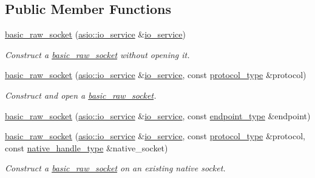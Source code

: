 \subsection*{Public Member Functions}
\begin{DoxyCompactItemize}
\item 
\hyperlink{classasio_1_1basic__raw__socket_ae2c344d0aa64b6cdafc8e39764a5c5ed}{basic\+\_\+raw\+\_\+socket} (\hyperlink{classasio_1_1io__service}{asio\+::io\+\_\+service} \&\hyperlink{classasio_1_1io__service}{io\+\_\+service})
\begin{DoxyCompactList}\small\item\em Construct a \hyperlink{classasio_1_1basic__raw__socket}{basic\+\_\+raw\+\_\+socket} without opening it. \end{DoxyCompactList}\item 
\hyperlink{classasio_1_1basic__raw__socket_aec4b688b73db9296858df12e3e292524}{basic\+\_\+raw\+\_\+socket} (\hyperlink{classasio_1_1io__service}{asio\+::io\+\_\+service} \&\hyperlink{classasio_1_1io__service}{io\+\_\+service}, const \hyperlink{classasio_1_1basic__raw__socket_aa7e790d1b35972ac2c4d1d5999b94d93}{protocol\+\_\+type} \&protocol)
\begin{DoxyCompactList}\small\item\em Construct and open a \hyperlink{classasio_1_1basic__raw__socket}{basic\+\_\+raw\+\_\+socket}. \end{DoxyCompactList}\item 
\hyperlink{classasio_1_1basic__raw__socket_ae5ba9061756d6e0e8a5d0d3d2d6db1ab}{basic\+\_\+raw\+\_\+socket} (\hyperlink{classasio_1_1io__service}{asio\+::io\+\_\+service} \&\hyperlink{classasio_1_1io__service}{io\+\_\+service}, const \hyperlink{classasio_1_1basic__raw__socket_a75803815223ab2cbfa66c51a650236b5}{endpoint\+\_\+type} \&endpoint)
\item 
\hyperlink{classasio_1_1basic__raw__socket_ac17f54b5c590bccec05fdf7a27ccbc0f}{basic\+\_\+raw\+\_\+socket} (\hyperlink{classasio_1_1io__service}{asio\+::io\+\_\+service} \&\hyperlink{classasio_1_1io__service}{io\+\_\+service}, const \hyperlink{classasio_1_1basic__raw__socket_aa7e790d1b35972ac2c4d1d5999b94d93}{protocol\+\_\+type} \&protocol, const \hyperlink{classasio_1_1basic__raw__socket_aa95021a3bc7d9d5a4648d4d82f57b8ae}{native\+\_\+handle\+\_\+type} \&native\+\_\+socket)
\begin{DoxyCompactList}\small\item\em Construct a \hyperlink{classasio_1_1basic__raw__socket}{basic\+\_\+raw\+\_\+socket} on an existing native socket. \end{DoxyCompactList}\item 

\end{DoxyCompactItemize}
